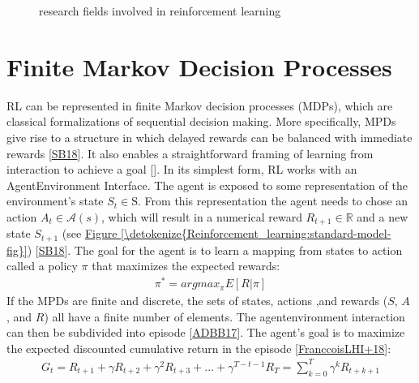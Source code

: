 \documentclass[letterpaper,10pt,english]{jupyterBook}
\let\sphinxpxdimen\pdfpxdimen\else\newdimen\sphinxpxdimen
\begin{document}
\begin{figure}[htbp]
\centering
\capstart

\noindent\sphinxincludegraphics[width=600\sphinxpxdimen,height=250\sphinxpxdimen]{{tree}.png}
\caption{research fields involved in reinforcement learning}\label{\detokenize{Reinforcement_learning:tree-fig}}\end{figure}


\section{Finite Markov Decision Processes}
\label{\detokenize{Reinforcement_learning:finite-markov-decision-processes}}
\sphinxAtStartPar
RL can be represented in finite Markov decision processes (MDPs), which are classical formalizations of sequential decision making. More specifically, MPDs give rise to a structure in which delayed rewards can be balanced with immediate rewards {[}\hyperlink{cite.Discussion:id70}{SB18}{]}. It also enables a straightforward framing of learning from interaction to achieve a goal {[}{]}. In its simplest form, RL works with an Agent\sphinxhyphen{}Environment Interface. The agent is exposed to some representation of the environment’s state \(S_t \in \mathrm{S}\). From this representation the agent needs to chose an action \( A_t \in \mathcal{A}(s)\), which will result in a numerical reward \(R_{t+1} \in 	\mathbb{R} \) and a new state \(S_{t+1}\) (see \hyperref[\detokenize{Reinforcement_learning:standard-model-fig}]{Figure \ref{\detokenize{Reinforcement_learning:standard-model-fig}}})  {[}\hyperlink{cite.Discussion:id70}{SB18}{]}. The goal for the agent is to learn a mapping from states to action called a policy \(\pi\) that maximizes the expected rewards:
\begin{equation*}
\begin{split} \pi^* = argmax_{\pi} E[R|\pi] \end{split}
\end{equation*}
\sphinxAtStartPar
If the MPDs are finite and discrete, the sets of states, actions ,and rewards (\(S\), \(A\) , and \(R\)) all have a finite number of elements. The agent\sphinxhyphen{}environment interaction can then be subdivided into episode {[}\hyperlink{cite.Discussion:id63}{ADBB17}{]}.  The agent’s goal is to maximize the expected discounted cumulative return in the episode {[}\hyperlink{cite.Discussion:id72}{FranccoisLHI+18}{]}:
\begin{equation}\label{equation:Reinforcement_learning:return}
\begin{split}G_t = R_{t+1} + \gamma R_{t+2} + \gamma^2 R_{t+3} + ... + \gamma^{T-t-1}R_T = \sum_{k=0}^T \gamma^k R_{t+k+1}\end{split}
\end{equation}
\end{document}
